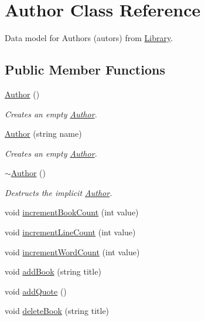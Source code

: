 \hypertarget{class_author}{\section{Author Class Reference}
\label{class_author}
}


Data model for Authors (autors) from \hyperlink{class_library}{Library}.  


\subsection*{Public Member Functions}
\begin{DoxyCompactItemize}
\item 
\hyperlink{class_author_a5f7059590a8e823fe0713faf66126b17}{Author} ()
\begin{DoxyCompactList}\small\item\em Creates an empty \hyperlink{class_author}{Author}. \end{DoxyCompactList}\item 
\hyperlink{class_author_a4a8afd3af0d6f7492bd04dcd44dc9f95}{Author} (string name)
\begin{DoxyCompactList}\small\item\em Creates an empty \hyperlink{class_author}{Author}. \end{DoxyCompactList}\item 
\hyperlink{class_author_ae1d4db056b321487cf7c07a2045d4a2d}{$\sim$\+Author} ()
\begin{DoxyCompactList}\small\item\em Destructs the implicit \hyperlink{class_author}{Author}. \end{DoxyCompactList}\item 
void \hyperlink{class_author_afa8dc68382f3e9828112ed440c3677d3}{increment\+Book\+Count} (int value)
\item 
void \hyperlink{class_author_a73814ef0d8d840880415c4020a4d5bf9}{increment\+Line\+Count} (int value)
\item 
void \hyperlink{class_author_af12d32bb751a9ac3e1508631e4d8fb8e}{increment\+Word\+Count} (int value)
\item 
void \hyperlink{class_author_a5836c0e00e740d4e9e9049e94f032cc3}{add\+Book} (string title)
\item 
void \hyperlink{class_author_ad284127163d234bad55e54e078521e8c}{add\+Quote} ()
\item 
void \hyperlink{class_author_ad48c2d5ae47d521bf5d4aa638bb86976}{delete\+Book} (string title)

\end{DoxyCompactItemize}
